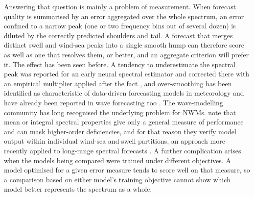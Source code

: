 Answering that question is mainly a problem of measurement. When forecast quality is summarised
by an error aggregated over the whole spectrum, an error confined to a narrow peak (one or two
frequency bins out of several dozen) is diluted by the correctly predicted shoulders and tail. A forecast that merges distinct swell and wind-sea peaks into a single
smooth hump can therefore score as well as one that resolves them, or better, and an aggregate
criterion will prefer it. The effect has been seen before. A tendency to underestimate the
spectral peak was reported for an early neural spectral estimator and corrected there with an
empirical multiplier applied after the fact \citep{namekar2006ann}, and over-smoothing has been
identified as characteristic of data-driven forecasting models in meteorology
\citep{benbouallegue2024rise} and have already been reported in wave forecasting too \citep{minuzzi2023lstm}. The wave-modelling community has long recognised the underlying problem for NWMs. \citet{hanson2009pacific} note that mean or integral spectral properties give only
a general measure of performance and can mask higher-order deficiencies, and for that reason they
verify model output within individual wind-sea and swell partitions, an approach more recently applied to
long-range spectral forecasts \citep{rogers2025espc}. A further complication arises when the models
being compared were trained under different objectives. A model optimised for a given error measure tends
to score well on that measure, so a comparison based on either model's training objective cannot show
which model better represents the spectrum as a whole.

